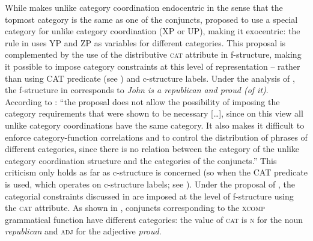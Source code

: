 \documentclass[output=paper]{../langscibook}
\begin{document}
While \citet{pete:04} makes unlike category coordination endocentric
in the sense that the topmost category is the same as one of the
conjuncts, \citet{Patejuk2015} proposed to use a special category for
unlike category coordination (XP or UP), making it
exocentric: the rule in  uses YP and
ZP as variables for different categories.
\ea\label{ex:Patejuk2015:4.8}
\hfill\citep[(4.8)]{Patejuk2015}
\z
This proposal is
complemented by the use of the distributive \textsc{cat} attribute in f-structure,
making it possible to impose category constraints at this level of
representation – rather than using \textsc{CAT} predicate (see ) and c-structure labels. Under the
analysis of \citet{Patejuk2015}, the f-structure in
 corresponds to \emph{John is a
  republican and proud (of it)}.
According to \citet[38]{dalr:17}: ``the proposal
does not allow the possibility of imposing the category requirements
that were shown to be necessary […], since on this view all
unlike category coordinations have the same category. It also makes it
difficult to enforce category-function correlations and to control the
distribution of phrases of different categories, since there is no
relation between the category of the unlike category coordination
structure and the categories of the conjuncts.''
This criticism only holds as far as c-structure is concerned (so when the
\textsc{CAT} predicate is used, which operates on c-structure
labels; see ). Under the proposal of \citet{Patejuk2015}, the
categorial constraints discussed in \citet{dalr:17} are imposed at
the level of f-structure using the \textsc{cat} attribute. As shown in
, conjuncts corresponding to the
\textsc{xcomp} grammatical function have different categories: the value of \textsc{cat} is \textsc{n} for the
noun \emph{republican} and \textsc{adj} for the adjective \emph{proud}.
\end{document}
